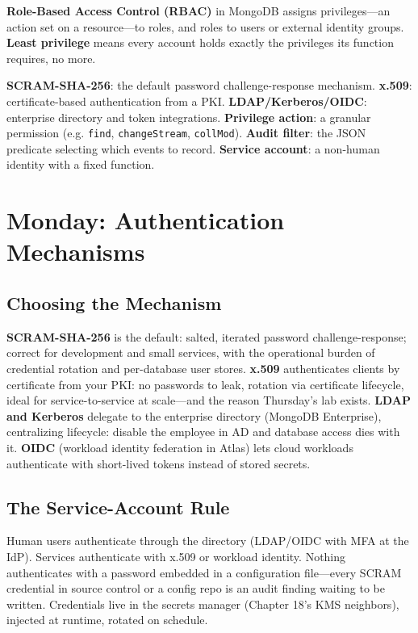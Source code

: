 \begin{definitionbox}
\textbf{Role-Based Access Control (RBAC)} in MongoDB assigns privileges---an action set on a resource---to roles, and roles to users or external identity groups. \textbf{Least privilege} means every account holds exactly the privileges its function requires, no more.
\end{definitionbox}

\begin{keyterms}
\textbf{SCRAM-SHA-256}: the default password challenge-response mechanism. \textbf{x.509}: certificate-based authentication from a PKI. \textbf{LDAP/Kerberos/OIDC}: enterprise directory and token integrations. \textbf{Privilege action}: a granular permission (e.g. \texttt{find}, \texttt{changeStream}, \texttt{collMod}). \textbf{Audit filter}: the JSON predicate selecting which events to record. \textbf{Service account}: a non-human identity with a fixed function.
\end{keyterms}

\section{Monday: Authentication Mechanisms}
\subsection{Choosing the Mechanism}
\textbf{SCRAM-SHA-256} is the default: salted, iterated password challenge-response; correct for development and small services, with the operational burden of credential rotation and per-database user stores. \textbf{x.509} authenticates clients by certificate from your PKI: no passwords to leak, rotation via certificate lifecycle, ideal for service-to-service at scale---and the reason Thursday's lab exists. \textbf{LDAP and Kerberos} delegate to the enterprise directory (MongoDB Enterprise), centralizing lifecycle: disable the employee in AD and database access dies with it. \textbf{OIDC} (workload identity federation in Atlas) lets cloud workloads authenticate with short-lived tokens instead of stored secrets.

\subsection{The Service-Account Rule}
Human users authenticate through the directory (LDAP/OIDC with MFA at the IdP). Services authenticate with x.509 or workload identity. Nothing authenticates with a password embedded in a configuration file---every SCRAM credential in source control or a config repo is an audit finding waiting to be written. Credentials live in the secrets manager (Chapter 18's KMS neighbors), injected at runtime, rotated on schedule.

